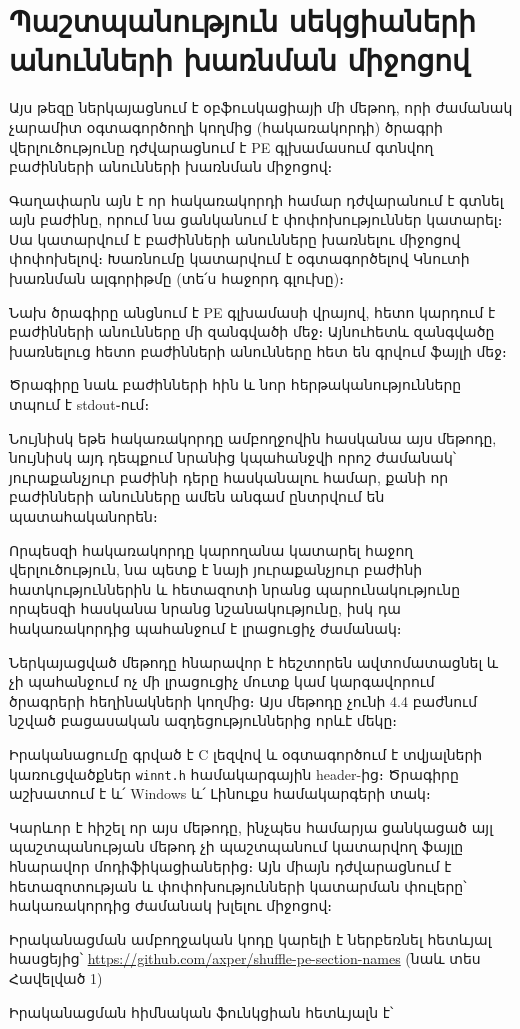 \documentclass[12pt]{article}
\begin{document}
\begin{sloppypar}
\section{Պաշտպանություն սեկցիաների անունների խառնման միջոցով}
Այս թեզը ներկայացնում է օբֆուսկացիայի մի մեթոդ, որի ժամանակ չարամիտ
օգտագործողի կողմից (հակառակորդի) ծրագրի վերլուծությունը դժվարացնում է
PE գլխամասում գտնվող բաժինների անունների խառնման միջոցով։

Գաղափարն այն է որ հակառակորդի համար դժվարանում է գտնել այն բաժինը, որում
նա ցանկանում է փոփոխություններ կատարել։ Սա կատարվում է բաժինների անունները
խառնելու միջոցով փոփոխելով։ Խառնումը կատարվում է օգտագործելով Կնուտի խառնման
ալգորիթմը (տե՛ս հաջորդ գլուխը)։

Նախ ծրագիրը անցնում է PE գլխամասի վրայով, հետո կարդում է բաժինների անունները
մի զանգվածի մեջ։ Այնուհետև զանգվածը խառնելուց հետո բաժինների անունները հետ
են գրվում ֆայլի մեջ։

Ծրագիրը նաև բաժինների հին և նոր հերթականությունները տպում է stdout֊ում։

Նույնիսկ եթե հակառակորդը ամբողջովին հասկանա այս մեթոդը, նույնիսկ այդ դեպքում
նրանից կպահանջվի որոշ ժամանակ՝ յուրաքանչյուր բաժինի դերը հասկանալու համար,
քանի որ բաժինների անունները ամեն անգամ ընտրվում են պատահականորեն։

Որպեսզի հակառակորդը կարողանա կատարել հաջող վերլուծություն, նա պետք է
նայի յուրաքանչյուր բաժինի հատկություններին և հետազոտի նրանց պարունակությունը
որպեսզի հասկանա նրանց նշանակությունը, իսկ դա հակառակորդից պահանջում է
լրացուցիչ ժամանակ։

Ներկայացված մեթոդը հնարավոր է հեշտորեն ավտոմատացնել և չի պահանջում ոչ մի
լրացուցիչ մուտք կամ կարգավորում ծրագրերի հեղինակների կողմից։ Այս մեթոդը չունի
4.4 բաժնում նշված բացասական ազդեցություններից որևէ մեկը։

Իրականացումը գրված է C լեզվով և օգտագործում է տվյալների կառուցվածքներ
\texttt{winnt.h} համակարգային header-ից։ Ծրագիրը աշխատում է և՛ Windows և՛
Լինուքս համակարգերի տակ։

Կարևոր է հիշել որ այս մեթոդը, ինչպես համարյա ցանկացած այլ
պաշտպանության մեթոդ չի պաշտպանում կատարվող ֆայլը հնարավոր մոդիֆիկացիաներից։
Այն միայն դժվարացնում է հետազոտության և փոփոխությունների կատարման փուլերը՝
հակառակորդից ժամանակ խլելու միջոցով։

Իրականացման ամբողջական կոդը կարելի է ներբեռնել հետևյալ հասցեյից՝
\url{https://github.com/axper/shuffle-pe-section-names}
(նաև տես Հավելված 1)

Իրականացման հիմնական ֆունկցիան հետևյալն է՝


\end{sloppypar}
\end{document}
